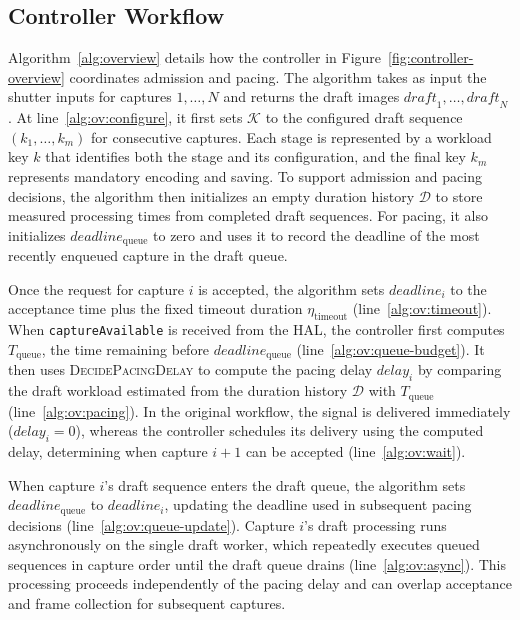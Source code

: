 \subsection{Controller Workflow}
\label{sec:workflow}



Algorithm~\ref{alg:overview} details how the controller in Figure~\ref{fig:controller-overview} coordinates admission and pacing.
The algorithm takes as input the shutter inputs for captures \(1,\ldots,N\) and returns the draft images \(\mathit{draft}_1,\ldots,\mathit{draft}_N\).
At line~\ref{alg:ov:configure}, it first sets \(\mathcal K\) to the configured draft sequence \((k_1,\ldots,k_m)\) for consecutive captures.
Each stage is represented by a workload key \(k\) that identifies both the stage and its configuration, and the final key \(k_m\) represents mandatory encoding and saving.
To support admission and pacing decisions, the algorithm then initializes an empty duration history \(\mathcal D\) to store measured processing times from completed draft sequences.
For pacing, it also initializes \(\mathit{deadline}_{\mathrm{queue}}\) to zero and uses it to record the deadline of the most recently enqueued capture in the draft queue.

Once the request for capture \(i\) is accepted, the algorithm sets \(\mathit{deadline}_i\) to the acceptance time plus the fixed timeout duration \(\eta_{\mathrm{timeout}}\) (line~\ref{alg:ov:timeout}).
When \texttt{captureAvailable} is received from the HAL, the controller first computes \(T_{\mathrm{queue}}\), the time remaining before \(\mathit{deadline}_{\mathrm{queue}}\) (line~\ref{alg:ov:queue-budget}).
It then uses \textsc{DecidePacingDelay} to compute the pacing delay \(\mathit{delay}_i\) by comparing the draft workload estimated from the duration history \(\mathcal D\) with \(T_{\mathrm{queue}}\) (line~\ref{alg:ov:pacing}).
In the original workflow, the signal is delivered immediately (\(\mathit{delay}_i=0\)), whereas the controller schedules its delivery using the computed delay, determining when capture \(i+1\) can be accepted (line~\ref{alg:ov:wait}).

When capture \(i\)'s draft sequence enters the draft queue, the algorithm sets \(\mathit{deadline}_{\mathrm{queue}}\) to \(\mathit{deadline}_i\), updating the deadline used in subsequent pacing decisions (line~\ref{alg:ov:queue-update}).
Capture \(i\)'s draft processing runs asynchronously on the single draft worker, which repeatedly executes queued sequences in capture order until the draft queue drains (line~\ref{alg:ov:async}).
This processing proceeds independently of the pacing delay and can overlap acceptance and frame collection for subsequent captures.

